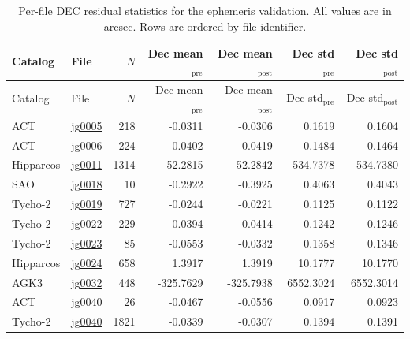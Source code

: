 {\begin{longtable}{llrrrrr}
\caption{Per-file DEC residual statistics for the ephemeris validation. All values are in arcsec. Rows are ordered by file identifier.}\label{tab:ephem_per_file_dec}\\
\hline
Catalog & File & $N$ & Dec mean$_\mathrm{pre}$ & Dec mean$_\mathrm{post}$ & Dec std$_\mathrm{pre}$ & Dec std$_\mathrm{post}$ \\
\hline
\endfirsthead
\hline
Catalog & File & $N$ & Dec mean$_\mathrm{pre}$ & Dec mean$_\mathrm{post}$ & Dec std$_\mathrm{pre}$ & Dec std$_\mathrm{post}$ \\
\hline
\endhead
\hline
\endfoot
ACT & \href{https://www.sai.msu.ru/neb/nss/html/obspos/OBS_COLL/J/jg0005.html}{jg0005} & 218 & -0.0311 & -0.0306 & 0.1619 & 0.1604 \\
ACT & \href{https://www.sai.msu.ru/neb/nss/html/obspos/OBS_COLL/J/jg0006.html}{jg0006} & 224 & -0.0402 & -0.0419 & 0.1484 & 0.1464 \\
Hipparcos & \href{https://www.sai.msu.ru/neb/nss/html/obspos/OBS_COLL/J/jg0011.html}{jg0011} & 1314 & 52.2815 & 52.2842 & 534.7378 & 534.7380 \\
SAO & \href{https://www.sai.msu.ru/neb/nss/html/obspos/OBS_COLL/J/jg0018.html}{jg0018} & 10 & -0.2922 & -0.3925 & 0.4063 & 0.4043 \\
Tycho-2 & \href{https://www.sai.msu.ru/neb/nss/html/obspos/OBS_COLL/J/jg0019.html}{jg0019} & 727 & -0.0244 & -0.0221 & 0.1125 & 0.1122 \\
Tycho-2 & \href{https://www.sai.msu.ru/neb/nss/html/obspos/OBS_COLL/J/jg0022.html}{jg0022} & 229 & -0.0394 & -0.0414 & 0.1242 & 0.1246 \\
Tycho-2 & \href{https://www.sai.msu.ru/neb/nss/html/obspos/OBS_COLL/J/jg0023.html}{jg0023} & 85 & -0.0553 & -0.0332 & 0.1358 & 0.1346 \\
Hipparcos & \href{https://www.sai.msu.ru/neb/nss/html/obspos/OBS_COLL/J/jg0024.html}{jg0024} & 658 & 1.3917 & 1.3919 & 10.1777 & 10.1770 \\
AGK3 & \href{https://www.sai.msu.ru/neb/nss/html/obspos/OBS_COLL/J/jg0032.html}{jg0032} & 448 & -325.7629 & -325.7938 & 6552.3024 & 6552.3014 \\
ACT & \href{https://www.sai.msu.ru/neb/nss/html/obspos/OBS_COLL/J/jg0040.html}{jg0040} & 26 & -0.0467 & -0.0556 & 0.0917 & 0.0923 \\
Tycho-2 & \href{https://www.sai.msu.ru/neb/nss/html/obspos/OBS_COLL/J/jg0040.html}{jg0040} & 1821 & -0.0339 & -0.0307 & 0.1394 & 0.1391 \\

\end{longtable}}
